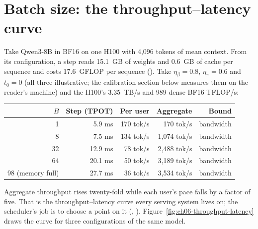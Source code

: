 
\section{Batch size: the throughput--latency curve}

Take Qwen3-8B in BF16 on one H100 with 4,096 tokens of mean context. From its
configuration, a step reads 15.1~GB of weights and 0.6~GB of cache per
sequence and costs 17.6~GFLOP per sequence (). Take
$\eta_\beta=0.8$, $\eta_\pi=0.6$ and $t_0=0$ (all three illustrative; the
calibration section below measures them on the reader's machine) and the H100's
3.35~TB/s and 989 dense BF16 TFLOP/s:

\begin{center}
\begin{tabular}{@{}rrrrr@{}}
\toprule
$B$ & Step (TPOT) & Per user & Aggregate & Bound \\
\midrule
1 & 5.9 ms & 170 tok/s & 170 tok/s & bandwidth \\
8 & 7.5 ms & 134 tok/s & 1,074 tok/s & bandwidth \\
32 & 12.9 ms & 78 tok/s & 2,488 tok/s & bandwidth \\
64 & 20.1 ms & 50 tok/s & 3,189 tok/s & bandwidth \\
98 (memory full) & 27.7 ms & 36 tok/s & 3,534 tok/s & bandwidth \\
\bottomrule
\end{tabular}
\end{center}

Aggregate throughput rises twenty-fold while each user's pace falls by a
factor of five. That is the throughput--latency curve every serving system
lives on; the scheduler's job is to choose a point on it
(, ).
Figure~\ref{fig:ch06-throughput-latency} draws the curve for three
configurations of the same model.


